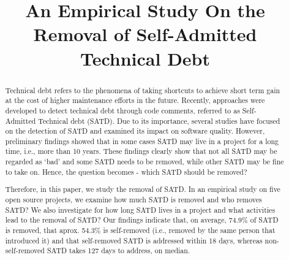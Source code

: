 \documentclass{sig-alternate}
\begin{document}







\title{An Empirical Study On the Removal of Self-Admitted Technical Debt}
\author{
}

\maketitle
\begin{abstract}
Technical debt refers to the phenomena of taking shortcuts to achieve short term gain at the cost of higher maintenance efforts in the future. Recently, approaches were developed to detect technical debt through code comments, referred to as Self-Admitted Technical debt (SATD). Due to its importance, several studies have focused on the detection of SATD and examined its impact on software quality. However, preliminary findings showed that in some cases SATD may live in a project for a long time, i.e., more than 10 years. These findings clearly show that not all SATD may be regarded as `bad' and some SATD needs to be removed, while other SATD may be fine to take on. Hence, the question becomes - which SATD should be removed?

Therefore, in this paper, we study the removal of SATD. In an empirical study on five open source projects, we examine how much SATD is removed and who removes SATD? We also investigate for how long SATD lives in a project and what activities lead to the removal of SATD? Our findings indicate that, on average, 74.9\% of SATD is removed, that aprox. 54.3\% is self-removed (i.e., removed by the same person that introduced it) and that self-removed SATD is addressed within 18 days, whereas non-self-removed SATD takes 127 days to address, on median.
\end{abstract}
\end{document}
